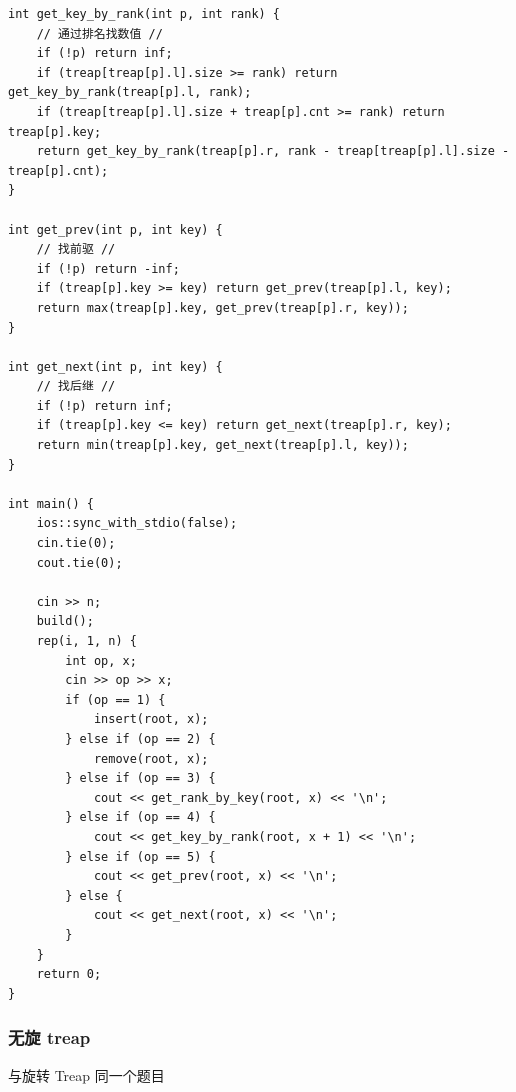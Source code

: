 \documentclass[UTF8, a4paper, titlepage, twoside]{ctexart}
\begin{document}
\begin{lstlisting}[style=cpp]
int get_key_by_rank(int p, int rank) {
    // 通过排名找数值 //
    if (!p) return inf;
    if (treap[treap[p].l].size >= rank) return get_key_by_rank(treap[p].l, rank);
    if (treap[treap[p].l].size + treap[p].cnt >= rank) return treap[p].key;
    return get_key_by_rank(treap[p].r, rank - treap[treap[p].l].size - treap[p].cnt);
}

int get_prev(int p, int key) {
    // 找前驱 //
    if (!p) return -inf;
    if (treap[p].key >= key) return get_prev(treap[p].l, key);
    return max(treap[p].key, get_prev(treap[p].r, key));
}

int get_next(int p, int key) {
    // 找后继 //
    if (!p) return inf;
    if (treap[p].key <= key) return get_next(treap[p].r, key);
    return min(treap[p].key, get_next(treap[p].l, key));
}

int main() {
    ios::sync_with_stdio(false);
    cin.tie(0);
    cout.tie(0);

    cin >> n;
    build();
    rep(i, 1, n) {
        int op, x;
        cin >> op >> x;
        if (op == 1) {
            insert(root, x);
        } else if (op == 2) {
            remove(root, x);
        } else if (op == 3) {
            cout << get_rank_by_key(root, x) << '\n';
        } else if (op == 4) {
            cout << get_key_by_rank(root, x + 1) << '\n';
        } else if (op == 5) {
            cout << get_prev(root, x) << '\n';
        } else {
            cout << get_next(root, x) << '\n';
        }
    }
    return 0;
}
\end{lstlisting}

\subsubsection*{ 无旋 treap }

与旋转 Treap 同一个题目
\end{document}
